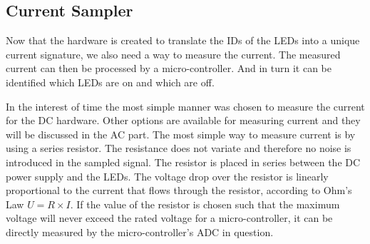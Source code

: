 
 \subsection{Current Sampler}

	Now that the hardware is created to translate the IDs of the LEDs into a unique current signature, we also need a way to measure the current.
	The measured current can then be processed by a micro-controller.
	And in turn it can be identified which LEDs are on and which are off.

	In the interest of time the most simple manner was chosen to measure the current for the DC hardware.
	Other options are available for measuring current and they will be discussed in the AC part.
	The most simple way to measure current is by using a series resistor.
	The resistance does not variate and therefore no noise is introduced in the sampled signal.
	The resistor is placed in series between the DC power supply and the LEDs.
	The voltage drop over the resistor is linearly proportional to the current that flows through the resistor, according to Ohm's Law $U = R \times I$.
	If the value of the resistor is chosen such that the maximum voltage will never exceed the rated voltage for a micro-controller, it can be directly measured by the micro-controller's ADC in question.